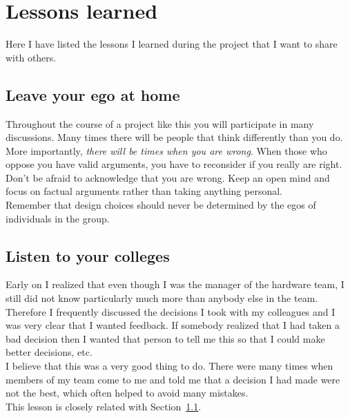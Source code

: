 
\section{Lessons learned}\label{sec:lessons}
Here I have listed the lessons I learned during the project that I want to share with others.

\subsection{Leave your ego at home}\label{sec:ego}
Throughout the course of a project like this you will participate in many discussions. Many times there will be people that think differently than you do. More importantly, \emph{there will be times when you are wrong}. When those who oppose you have valid arguments, you have to reconsider if you really are right. \\
Don't be afraid to acknowledge that you are wrong. Keep an open mind and focus on factual arguments rather than taking anything personal. \\
Remember that design choices should never be determined by the egos of individuals in the group.


\subsection{Listen to your colleges}\label{sec:listen}
Early on I realized that even though I was the manager of the hardware team, I still did not know particularly much more than anybody else in the team. Therefore I frequently discussed the decisions I took with my colleagues and I was very clear that I wanted feedback. If somebody realized that I had taken a bad decision then I wanted that person to tell me this so that I could make better decisions, etc. \\
I believe that this was a very good thing to do. There were many times when members of my team come to me and told me that a decision I had made were not the best, which often helped to avoid many mistakes. \\
This lesson is closely related with Section~\ref{sec:ego}.


